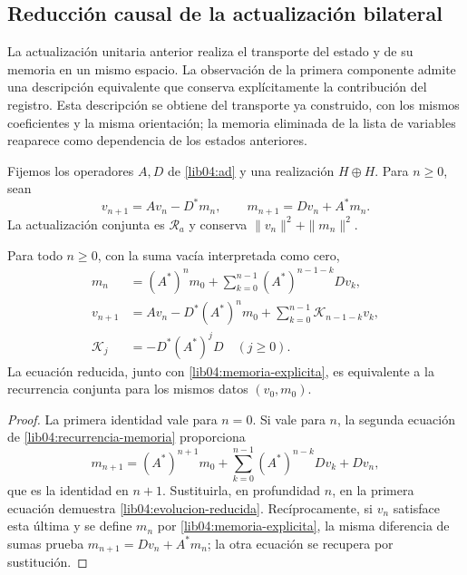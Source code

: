 \subsection{Reducción causal de la actualización bilateral}
\label{lib04:reduccion-causal}

La actualización unitaria anterior realiza el transporte del estado y de su
memoria en un mismo espacio. La observación de la primera componente admite
una descripción equivalente que conserva explícitamente la contribución del
registro. Esta descripción se obtiene del transporte ya construido, con los
mismos coeficientes y la misma orientación; la memoria eliminada de la lista
de variables reaparece como dependencia de los estados anteriores.

Fijemos los operadores \(A,D\) de \eqref{lib04:ad} y una realización
\(H\oplus H\). Para \(n\geq0\), sean
\begin{equation}
 v_{n+1}=Av_n-D^*m_n,\qquad
 m_{n+1}=Dv_n+A^*m_n.
 \label{lib04:recurrencia-memoria}
\end{equation}
La actualización conjunta es \(\mathscr R_a\) y conserva
\(\|v_n\|^2+\|m_n\|^2\).

\begin{proposition}
\label{lib04:prop-memoria-reducida}
Para todo \(n\geq0\), con la suma vacía interpretada como cero,
\begin{align}
 m_n&=(A^*)^n m_0+
       \sum_{k=0}^{n-1}(A^*)^{n-1-k}Dv_k,
       \label{lib04:memoria-explicita}\\
 v_{n+1}&=Av_n-D^*(A^*)^n m_0
       +\sum_{k=0}^{n-1}\mathscr K_{n-1-k}v_k,
       \label{lib04:evolucion-reducida}\\
 \mathscr K_j&=-D^*(A^*)^jD\quad(j\geq0).
       \label{lib04:nucleo-retardo}
\end{align}
La ecuación reducida, junto con \eqref{lib04:memoria-explicita}, es
equivalente a la recurrencia conjunta para los mismos datos \((v_0,m_0)\).
\end{proposition}
\begin{proof}
La primera identidad vale para \(n=0\). Si vale para \(n\), la segunda
ecuación de \eqref{lib04:recurrencia-memoria} proporciona
\[
 m_{n+1}=(A^*)^{n+1}m_0+
 \sum_{k=0}^{n-1}(A^*)^{n-k}Dv_k+Dv_n,
\]
que es la identidad en \(n+1\). Sustituirla, en profundidad \(n\), en
la primera ecuación demuestra \eqref{lib04:evolucion-reducida}.
Recíprocamente, si \(v_n\) satisface esta última y se define \(m_n\)
por \eqref{lib04:memoria-explicita}, la misma diferencia de sumas prueba
\(m_{n+1}=Dv_n+A^*m_n\); la otra ecuación se recupera por sustitución.
\end{proof}

